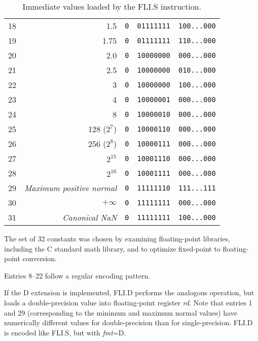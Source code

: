 \begin{table}[h]
\begin{tabular}{|r|r|c|c|c|}
18          & 1.5                              & {\tt 0} & {\tt 01111111} & {\tt 100...000} \\
19          & 1.75                             & {\tt 0} & {\tt 01111111} & {\tt 110...000} \\
20          & 2.0                              & {\tt 0} & {\tt 10000000} & {\tt 000...000} \\
21          & 2.5                              & {\tt 0} & {\tt 10000000} & {\tt 010...000} \\
22          & 3                                & {\tt 0} & {\tt 10000000} & {\tt 100...000} \\
23          & 4                                & {\tt 0} & {\tt 10000001} & {\tt 000...000} \\
24          & 8                                & {\tt 0} & {\tt 10000010} & {\tt 000...000} \\
25          & 128 ($2^7$)                      & {\tt 0} & {\tt 10000110} & {\tt 000...000} \\
26          & 256 ($2^8$)                      & {\tt 0} & {\tt 10000111} & {\tt 000...000} \\
27          & $2^{15}$                         & {\tt 0} & {\tt 10001110} & {\tt 000...000} \\
28          & $2^{16}$                         & {\tt 0} & {\tt 10001111} & {\tt 000...000} \\
29          & {\em Maximum positive normal}    & {\tt 0} & {\tt 11111110} & {\tt 111...111} \\
30          & $+\infty$                        & {\tt 0} & {\tt 11111111} & {\tt 000...000} \\
31          & {\em Canonical NaN}              & {\tt 0} & {\tt 11111111} & {\tt 100...000} \\
\hline
\end{tabular}
\caption{Immediate values loaded by the FLI.S instruction.}
\label{tab:flis}
\end{table}

\begin{commentary}
The set of 32 constants was chosen by examining floating-point libraries,
including the C standard math library, and to optimize fixed-point to
floating-point conversion.

Entries 8--22 follow a regular encoding pattern.
\end{commentary}

If the D extension is implemented, FLI.D performs the analogous operation,
but loads a double-precision value into floating-point register {\em rd}.
Note that entries 1 and 29 (corresponding to the minimum and maximum
normal values) have numerically different values for double-precision than
for single-precision.
FLI.D is encoded like FLI.S, but with {\em fmt}=D.

